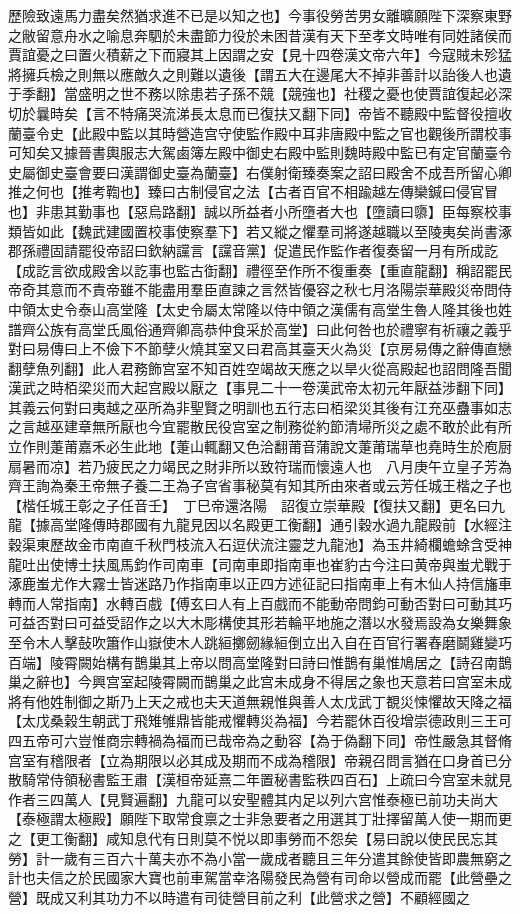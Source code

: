 歷險致遠馬力盡矣然猶求進不已是以知之也】今事役勞苦男女離曠願陛下深察東野之敝留意舟水之喻息奔駟於未盡節力役於未困昔漢有天下至孝文時唯有同姓諸侯而賈誼憂之曰置火積薪之下而寢其上因謂之安【見十四卷漢文帝六年】今寇賊未殄猛將擁兵檢之則無以應敵久之則難以遺後【謂五大在邊尾大不掉非善計以詒後人也遺于季翻】當盛明之世不務以除患若子孫不競【競強也】社稷之憂也使賈誼復起必深切於曩時矣【言不特痛哭流涕長太息而已復扶又翻下同】帝皆不聽殿中監督役擅收蘭臺令史【此殿中監以其時營造宫守使監作殿中耳非唐殿中監之官也觀後所謂校事可知矣又據晉書輿服志大駕鹵簿左殿中御史右殿中監則魏時殿中監已有定官蘭臺令史屬御史臺會要曰漢謂御史臺為蘭臺】右僕射衛臻奏案之詔曰殿舍不成吾所留心卿推之何也【推考鞫也】臻曰古制侵官之法【古者百官不相踰越左傳欒鍼曰侵官冒也】非患其勤事也【惡烏路翻】誠以所益者小所墮者大也【墮讀曰隳】臣每察校事類皆如此【魏武建國置校事使察羣下】若又縱之懼羣司將遂越職以至陵夷矣尚書涿郡孫禮固請罷役帝詔曰欽納讜言【讜音黨】促遣民作監作者復奏留一月有所成訖【成訖言欲成殿舍以訖事也監古衘翻】禮徑至作所不復重奏【重直龍翻】稱詔罷民帝奇其意而不責帝雖不能盡用羣臣直諫之言然皆優容之秋七月洛陽崇華殿災帝問侍中領太史令泰山高堂隆【太史令屬太常隆以侍中領之漢儒有高堂生魯人隆其後也姓譜齊公族有高堂氏風俗通齊卿高恭仲食采於高堂】曰此何咎也於禮寧有祈禳之義乎對曰易傳曰上不儉下不節孽火燒其室又曰君高其臺天火為災【京房易傳之辭傳直戀翻孽魚列翻】此人君務飾宫室不知百姓空竭故天應之以旱火從高殿起也詔問隆吾聞漢武之時栢梁災而大起宫殿以厭之【事見二十一卷漢武帝太初元年厭益涉翻下同】其義云何對曰夷越之巫所為非聖賢之明訓也五行志曰栢梁災其後有江充巫蠱事如志之言越巫建章無所厭也今宜罷散民役宫室之制務從約節清埽所災之處不敢於此有所立作則萐莆嘉禾必生此地【萐山輒翻又色洽翻莆音蒲說文萐莆瑞草也堯時生於庖厨扇暑而凉】若乃疲民之力竭民之財非所以致符瑞而懷遠人也　八月庚午立皇子芳為齊王詢為秦王帝無子養二王為子宫省事秘莫有知其所由來者或云芳任城王楷之子也【楷任城王彰之子任音壬】　丁巳帝還洛陽　詔復立崇華殿【復扶又翻】更名曰九龍【據高堂隆傳時郡國有九龍見因以名殿更工衡翻】通引穀水過九龍殿前【水經注穀渠東歷故金市南直千秋門枝流入石逗伏流注靈芝九龍池】為玉井綺欄蟾蜍含受神龍吐出使博士扶風馬鈞作司南車【司南車即指南車也崔豹古今注曰黄帝與蚩尤戰于涿鹿蚩尤作大霧士皆迷路乃作指南車以正四方述征記曰指南車上有木仙人持信旛車轉而人常指南】水轉百戲【傅玄曰人有上百戲而不能動帝問鈞可動否對曰可動其巧可益否對曰可益受詔作之以大木彫構使其形若輪平地施之潛以水發焉設為女樂舞象至令木人擊鼔吹簫作山嶽使木人跳絙擲劒緣絙倒立出入自在百官行署舂磨鬬雞變巧百端】陵霄闕始構有鵲巢其上帝以問高堂隆對曰詩曰惟鵲有巢惟鳩居之【詩召南鵲巢之辭也】今興宫室起陵霄闕而鵲巢之此宫未成身不得居之象也天意若曰宫室未成將有他姓制御之斯乃上天之戒也夫天道無親惟與善人太戊武丁覩災悚懼故天降之福【太戊桑榖生朝武丁飛雉雊鼎皆能戒懼轉災為福】今若罷休百役增崇德政則三王可四五帝可六豈惟商宗轉禍為福而已哉帝為之動容【為于偽翻下同】帝性嚴急其督脩宫室有稽限者【立為期限以必其成及期而不成為稽限】帝親召問言猶在口身首已分散騎常侍領秘書監王肅【漢桓帝延熹二年置秘書監秩四百石】上疏曰今宫室未就見作者三四萬人【見賢遍翻】九龍可以安聖體其内足以列六宫惟泰極已前功夫尚大【泰極謂太極殿】願陛下取常食禀之士非急要者之用選其丁壯擇留萬人使一期而更之【更工衡翻】咸知息代有日則莫不悦以即事勞而不怨矣【易曰說以使民民忘其勞】計一歲有三百六十萬夫亦不為小當一歲成者聽且三年分遣其餘使皆即農無窮之計也夫信之於民國家大寶也前車駕當幸洛陽發民為營有司命以營成而罷【此營壘之營】既成又利其功力不以時遣有司徒營目前之利【此營求之營】不顧經國之
